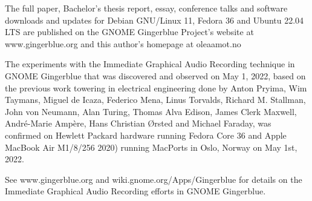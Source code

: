 \documentclass[a4paper]{article}
\begin{document}
The full paper, Bachelor's thesis report, essay, conference talks and
software downloads and updates for Debian GNU/Linux 11, Fedora 36 and
Ubuntu 22.04 LTS are published on the GNOME Gingerblue Project's
website at www.gingerblue.org and this author's homepage at oleaamot.no

The experiments with the Immediate Graphical Audio Recording technique
in GNOME Gingerblue that was discovered and observed on May 1, 2022,
based on the previous work towering in electrical engineering done by
Anton Pryima, Wim Taymans, Miguel de Icaza, Federico Mena, Linus
Torvalds, Richard M. Stallman, John von Neumann, Alan Turing, Thomas
Alva Edison, James Clerk Maxwell, Andr\'e-Marie Amp\`ere, Hans
Christian \O{}rsted and Michael Faraday, was confirmed on Hewlett
Packard hardware running Fedora Core 36 and Apple MacBook Air M1/8/256
2020) running MacPorts in Oslo, Norway on May 1st, 2022.

See www.gingerblue.org and wiki.gnome.org/Apps/Gingerblue for details on the Immediate Graphical Audio Recording efforts in GNOME Gingerblue.
\end{document}
